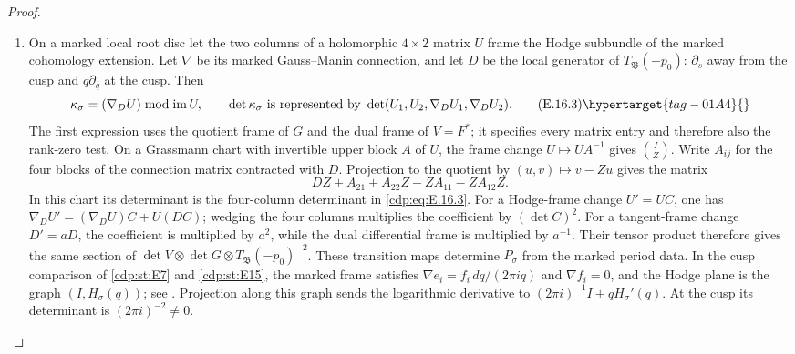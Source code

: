 \begin{proof}
\begin{enumerate}[label=\arabic*.,leftmargin=*]
\item On a marked local root disc let the two columns of a holomorphic $4\times2$ matrix $U$ frame the Hodge subbundle of the marked cohomology extension. Let $\nabla$ be its marked Gauss--Manin connection, and let $D$ be the local generator of $T_{\mathfrak B}(-p_0)$: $\partial_s$ away from the cusp and $q\partial_q$ at the cusp. Then
\[
 \kappa_\sigma=(\nabla_DU)\bmod\operatorname{im}U,
 \qquad
 \det\kappa_\sigma\ \text{is represented by}\
 \det(U_1,U_2,\nabla_DU_1,\nabla_DU_2).              \tag{E.16.3}\hypertarget{tag-01A4}{}\label{cdp:eq:E.16.3}
\]
The first expression uses the quotient frame of $G$ and the dual frame
of $V=F^*$; it specifies every matrix entry and therefore also the
rank-zero test. On a Grassmann chart with invertible upper block $A$
of $U$, the frame change $U\mapsto UA^{-1}$ gives
$\binom{I}{Z}$. Write $A_{ij}$ for the four blocks of the connection
matrix contracted with $D$. Projection to the quotient by
$(u,v)\mapsto v-Zu$ gives the matrix
\[
 DZ+A_{21}+A_{22}Z-ZA_{11}-ZA_{12}Z.
\]
In this chart its determinant is the four-column determinant in
\eqref{cdp:eq:E.16.3}. For a Hodge-frame change $U'=UC$, one has
$\nabla_DU'=(\nabla_DU)C+U(DC)$; wedging the four columns
multiplies the coefficient by $(\det C)^2$.
For a tangent-frame change $D'=aD$, the coefficient is multiplied
by $a^2$, while the dual differential frame is multiplied by
$a^{-1}$. Their tensor product therefore gives the same section of
$\det V\otimes\det G\otimes T_{\mathfrak B}(-p_0)^{-2}$.
These transition maps determine $P_\sigma$ from the marked period data. In the cusp comparison of \ref{cdp:st:E7} and \ref{cdp:st:E15},
the marked frame satisfies
$\nabla e_i=f_i\,dq/(2\pi iq)$ and $\nabla f_i=0$,
and the Hodge plane is the graph $(I,H_\sigma(q))$;
see \cite[Proposition~4.1, p.~12]{Viaclovsky2026Combs}.
Projection along this graph sends the logarithmic derivative to
$(2\pi i)^{-1}I+qH_\sigma'(q)$. At the cusp its determinant is
$(2\pi i)^{-2}\ne0$.

\end{enumerate}
\end{proof}